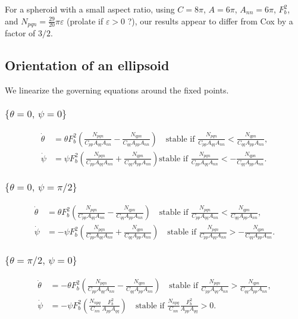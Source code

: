 \documentclass[12pt]{My_preprint}
\begin{document}
For a spheroid with a small aspect ratio, using $C = 8\pi$, $A = 6\pi$, $A_{nn} = 6\pi$, $F_b^2$, and $N_{pqn} = \frac{29}{20}\pi \varepsilon$ (prolate if $\varepsilon >0$ ?), our results appear to differ from Cox by a factor of $3/2$.


\subsection{Orientation of an ellipsoid}
We linearize the governing equations around the fixed points.
 
\subsubsection{$\{\theta = 0, \, \psi = 0\}$}
\begin{align}
    \dot \theta  &=  \theta F_b^2 \left(\frac{N_{pqn}}{C_{pp}A_{qq} A_{nn}} - \frac{N_{qpn}}{C_{qq}A_{pp} A_{nn}}\right) \quad \text{stable if $\frac{N_{pqn}}{C_{pp}A_{qq} A_{nn}}$} <\frac{N_{qpn}}{C_{qq}A_{pp} A_{nn}}, \\
    \dot \psi   &=  \psi F_b^2 \left(\frac{N_{pqn}}{C_{pp}A_{qq} A_{nn}}+\frac{N_{qpn}}{C_{qq}A_{pp} A_{nn}}\right)\text{stable if $\frac{N_{pqn}}{C_{pp}A_{qq} A_{nn}}  < -\frac{N_{qpn}}{C_{qq}A_{pp} A_{nn}}$}.
\end{align}
\subsubsection{$\{\theta = 0, \, \psi = \pi/2\}$}
\begin{align}
    \dot \theta  &=  \theta F_b^2 \left(\frac{N_{pqn}}{C_{pp}A_{qq} A_{nn}} - \frac{N_{qpn}}{C_{qq}A_{pp} A_{nn}}\right) \quad \text{stable if $\frac{N_{pqn}}{C_{pp}A_{qq} A_{nn}}$} <\frac{N_{qpn}}{C_{qq}A_{pp} A_{nn}}, \\
    \dot \psi   &=  -\psi F_b^2 \left(\frac{N_{pqn}}{C_{pp}A_{qq} A_{nn}}+\frac{N_{qpn}}{C_{qq}A_{pp} A_{nn}}\right) \quad \text{stable if $\frac{N_{pqn}}{C_{pp}A_{qq} A_{nn}}  > -\frac{N_{qpn}}{C_{qq}A_{pp} A_{nn}}$}.
\end{align}
\subsubsection{$\{\theta = \pi/2, \, \psi = 0\}$}
\begin{align}
    \dot \theta  &=  -\theta F_b^2 \left(\frac{N_{pqn}}{C_{pp}A_{qq} A_{nn}} - \frac{N_{qpn}}{C_{qq}A_{pp} A_{nn}}\right)\quad \text{stable if $\frac{N_{pqn}}{C_{pp}A_{qq} A_{nn}}$} >\frac{N_{qpn}}{C_{qq}A_{pp} A_{nn}}, \\
    \dot \psi   &= -\psi F_b^2 \left(\frac{N_{npq}}{C_{nn}}\frac{F_b^2}{A_{pp} A_{qq}}\right)\quad \text{stable if $\frac{N_{npq}}{C_{nn}}\frac{F_b^2}{A_{pp} A_{qq}}>0$}.
\end{align}
\end{document}
